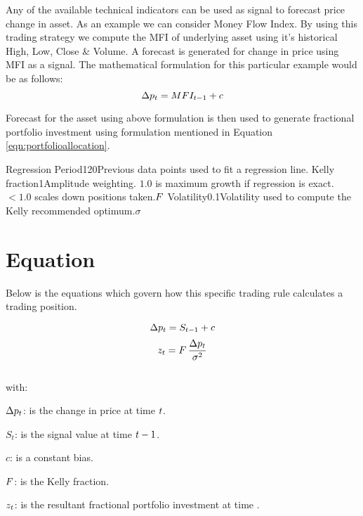 \documentclass{article}
\begin{document}
\logo
{} %
\tblofcontents


\howtotrade
{Any of the available technical indicators can be used as signal to forecast price change in asset. As an example we can consider Money Flow Index. By using this trading strategy we compute the MFI of underlying asset using it's historical High, Low, Close \& Volume. A forecast is generated for change in price using MFI as a signal. The mathematical formulation for this particular example would be as follows:
\begin{equation}
    \Delta p_{t} = MFI_{t-1} + c
\end{equation}

Forecast for the asset using above formulation is then used to generate fractional portfolio investment using formulation mentioned in Equation \ref{eqn:portfolioallocation}.
}

{Regression Period}{120}{Previous data points used to fit a regression line.}{\lookbacklength}
{Kelly fraction}{1}{Amplitude weighting. $1.0$ is maximum growth if regression is exact.
$<1.0$ scales down positions taken.}{$F$}
{Volatility}{0.1}{Volatility used to compute the Kelly recommended optimum.}{$\sigma$}
\stoptable %

\section{Equation}
Below is the equations which govern how this specific trading rule calculates a trading position.

\begin{equation}
\Delta p_{t} = S_{t-1} + c
\end{equation}
\begin{equation}
\label{eqn:portfolioallocation}
    z_{t} = F \, \frac{\Delta p_{t}}{\sigma^{2}}
\end{equation}
\\
with:

$\Delta p_{t}$: is the change in price at time $t$.

$S_{t}$: is the signal value at time $t -1$.

$c$: is a constant bias.

$F$: is the Kelly fraction.

$z_{t}$: is the resultant fractional portfolio investment at time \currenttime.


\keyterms
\furtherlinks %
\end{document}

